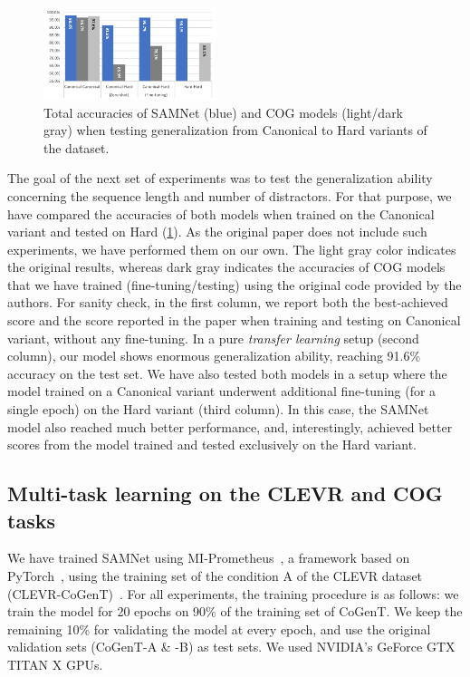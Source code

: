 \begin{figure}[htb]
	\centering
	\includegraphics[width=0.45\textwidth]{img/results/samnet_cog_overall_transfer.png}
	\caption{Total accuracies of SAMNet (blue) and COG models (light/dark gray) when testing generalization from Canonical to Hard variants of the dataset.}
	\label{fig:samnet_cog_overall_transfer}
\end{figure}

The goal of the next set of experiments was to test the generalization ability concerning the sequence length and number of distractors.
For that purpose, we have compared the accuracies of both models when trained on the Canonical variant and tested on Hard (\cref{fig:samnet_cog_overall_transfer}).
As the original paper does not include such experiments, we have performed them on our own. The light gray color indicates the original results, whereas dark gray indicates the accuracies of COG models that we have trained (fine-tuning/testing) using the original code provided by the authors.
For sanity check, in the first column, we report both the best-achieved score and the score reported in the paper when training and testing on Canonical variant, without any fine-tuning.
In a pure \textit{transfer learning} setup (second column), our model shows enormous generalization ability, reaching 91.6\% accuracy on the test set.
We have also tested both models in a setup where the model trained on a Canonical variant underwent additional fine-tuning (for a single epoch) on the Hard variant (third column).
In this case, the SAMNet model also reached much better performance, and, interestingly, achieved better scores from the model trained and tested exclusively on the Hard variant.


\subsection{Multi-task learning on the CLEVR and COG tasks}

We have trained SAMNet using MI-Prometheus~\cite{kornuta2018accelerating}, a framework based on PyTorch~\cite{paszke2017automatic}, using the training set of the condition A of the CLEVR dataset (CLEVR-CoGenT)~\cite{johnson2017clevr}.
For all experiments, the training procedure is as follows: we train the model for 20 epochs on 90\% of the training set of CoGenT. We keep the remaining 10\% for validating the model at every epoch, and use the original validation sets (CoGenT-A  \& -B) as test sets. We used NVIDIA's GeForce GTX TITAN X GPUs.

